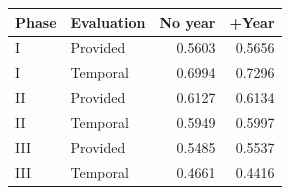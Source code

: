 \begin{tabular}{llrr}
\toprule
Phase & Evaluation & No year & +Year \\
\midrule
I & Provided & 0.5603 & 0.5656 \\
I & Temporal & 0.6994 & 0.7296 \\
II & Provided & 0.6127 & 0.6134 \\
II & Temporal & 0.5949 & 0.5997 \\
III & Provided & 0.5485 & 0.5537 \\
III & Temporal & 0.4661 & 0.4416 \\
\bottomrule
\end{tabular}
